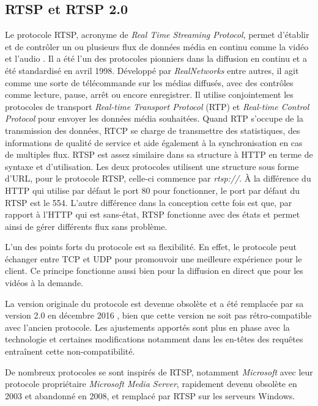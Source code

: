 \documentclass{polytech/polytech}
\begin{document}
\subsection{RTSP et RTSP 2.0}
\label{subsec:rtsp}

Le protocole RTSP, acronyme de \textit{Real Time Streaming Protocol}, permet d’établir et de contrôler un ou plusieurs flux de données média en continu comme la vidéo et l’audio \cite{rtsp_1996}. Il a été l’un des protocoles pionniers dans la diffusion en continu et a été standardisé en avril 1998. Développé par \textit{RealNetworks} entre autres, il agit comme une sorte de télécommande sur les médias diffusés, avec des contrôles comme lecture, pause, arrêt ou encore enregistrer. Il utilise conjointement les protocoles de transport \textit{Real-time Transport Protocol} (RTP) et \textit{Real-time Control Protocol} pour envoyer les données média souhaitées. Quand RTP s’occupe de la transmission des données, RTCP se charge de transmettre des statistiques, des informations de qualité de service et aide également à la synchronisation en cas de multiples flux. RTSP est assez similaire dans sa structure à HTTP en terme de syntaxe et d’utilisation. Les deux protocoles utilisent une structure sous forme d’URL, pour le protocole RTSP, celle-ci commence par \textit{rtsp://}. À la différence du HTTP qui utilise par défaut le port 80 pour fonctionner, le port par défaut du RTSP est le 554. L’autre différence dans la conception cette fois est que, par rapport à l’HTTP qui est sans-état, RTSP fonctionne avec des états et permet ainsi de gérer différents flux sans problème.

L’un des points forts du protocole est sa flexibilité. En effet, le protocole peut échanger entre TCP et UDP pour promouvoir une meilleure expérience pour le client. Ce principe fonctionne aussi bien pour la diffusion en direct que pour les vidéos à la demande.

La version originale du protocole est devenue obsolète et a été remplacée par sa version 2.0 en décembre 2016 \cite{rao_real-time_2016}, bien que cette version ne soit pas rétro-compatible avec l’ancien protocole. Les ajustements apportés sont plus en phase avec la technologie et certaines modifications notamment dans les en-têtes des requêtes entraînent cette non-compatibilité.

De nombreux protocoles se sont inspirés de RTSP, notamment \textit{Microsoft} avec leur protocole propriétaire \textit{Microsoft Media Server}, rapidement devenu obsolète en 2003 et abandonné en 2008, et remplacé par RTSP sur les serveurs Windows.
\end{document}
